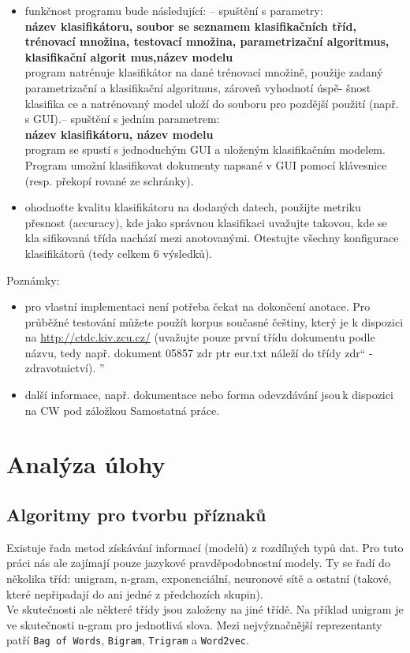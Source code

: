 \documentclass[12pt]{article}
\begin{document}
\begin{itemize}
\item funkčnost programu bude následující:
– spuštění s parametry:\\
\textbf{název klasifikátoru, soubor se seznamem klasifikačních tříd, trénovací množina, testovací množina, parametrizační algoritmus, klasifikační algorit    mus,název modelu}\\
program natrénuje klasifikátor na dané trénovací množině, použije zadaný parametrizační a klasifikační algoritmus, zároveň vyhodnotí úspě- šnost klasifika    ce a natrénovaný model uloží do souboru pro pozdější použití (např. s GUI).– spuštění s jedním parametrem:\\
\textbf{název klasifikátoru, název modelu} \\
program se spustí s jednoduchým GUI a uloženým klasifikačním modelem. Program umožní klasifikovat dokumenty napsané v GUI pomocí klávesnice (resp. překopí    rované ze schránky).

\item ohodnoťte kvalitu klasifikátoru na dodaných datech, použijte metriku přesnost (accuracy), kde jako správnou klasifikaci uvažujte takovou, kde se kla    sifikovaná třída nachází mezi anotovanými. Otestujte všechny konfigurace klasifikátorů (tedy celkem 6 výsledků).
\end{itemize}


Poznámky:
\begin{itemize}
\item pro vlastní implementaci není potřeba čekat na dokončení anotace. Pro průběžné testování můžete použít korpus současné češtiny, který je k dispozici     na \url{http://ctdc.kiv.zcu.cz/} (uvažujte pouze první třídu dokumentu podle názvu, tedy např.
dokument 05857 zdr ptr eur.txt náleží do třídy zdr“ - zdravotnictví).
”
\item další informace, např. dokumentace nebo forma odevzdávání jsou\,k dispozici na CW pod záložkou Samostatná práce.

\end{itemize}
%
%
\pagebreak
%
\section{Analýza úlohy}
\subsection{Algoritmy pro tvorbu příznaků}
Existuje řada metod získávání informací (modelů) z rozdílných typů dat.
Pro tuto
práci nás ale zajímají pouze jazykové pravděpodobnostní modely. Ty se
řadí do několika tříd: unigram, n-gram, exponenciální, neuronové sítě
a ostatní (takové, které nepřipadají do ani jedné z předchozích skupin).\\
Ve skutečnosti ale některé třídy jsou založeny na jiné třídě. Na
příklad unigram je ve skutečnosti n-gram pro jednotlivá slova. Mezi
nejvýznačnější reprezentanty patří \texttt{Bag of Words},
\texttt{Bigram}, \texttt{Trigram} a \texttt{Word2vec}.
\end{document}
